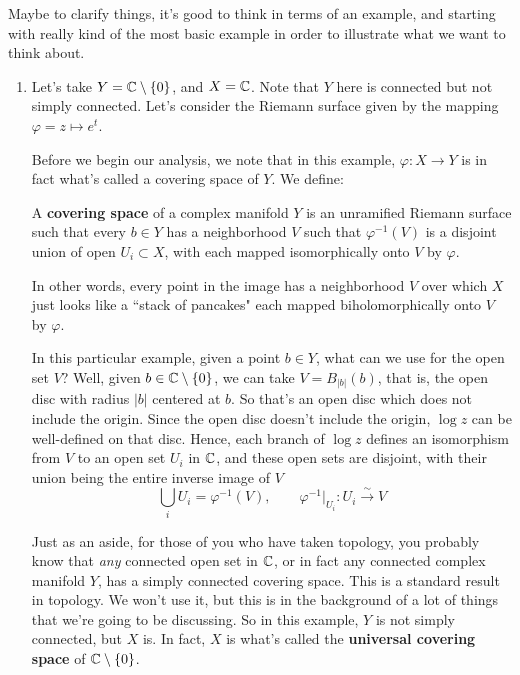 \documentclass{article}
\begin{document}
Maybe to clarify things, it's good to think in terms of an example, and starting with really kind of the most basic example in order to illustrate what we want to think about.

\begin{enumerate}


  \item \label{example:et_riemann_surface}
  Let's take \(Y = \mathbb{C} \setminus \{0\}\), and \(X = \mathbb{C}\). Note that \(Y\) here is connected but not simply connected. Let's consider the Riemann surface given by the mapping \(\varphi = z \mapsto e^t\).

  Before we begin our analysis, we note that in this example, \(\varphi: X \to Y\) is in fact what's called a covering space of \(Y\). We define:
  \begin{definition}
  A \textbf{covering space} of a complex manifold \(Y\) is an unramified Riemann surface such that every \(b \in Y\) has a neighborhood \(V\) such that \(\varphi^{-1}(V)\) is a disjoint union of open \(U_i \subset X\), with each mapped isomorphically onto \(V\) by \(\varphi\).
  \end{definition}
  In other words, every point in the image has a neighborhood \(V\) over which \(X\) just looks like a ``stack of pancakes" each mapped biholomorphically onto \(V\) by \(\varphi\).

  In this particular example, given a point \(b \in Y\), what can we use for the open set \(V\)? Well, given \(b \in \mathbb{C} \setminus \{0\}\), we can take \(V = B_{|b|}(b)\), that is, the open disc with radius \(|b|\) centered at \(b\). So that's an open disc which does not include the origin. Since the open disc doesn't include the origin, \(\log z\) can be well-defined on that disc. Hence, each branch of \(\log z\) defines an isomorphism from \(V\) to an open set \(U_i\) in \(\mathbb{C}\), and these open sets are disjoint, with their union being the entire inverse image of \(V\)
  \begin{equation}
    \bigcup_iU_i = \varphi^{-1}(V), \qquad \varphi^{-1}|_{U_i}: U_i \xrightarrow{\sim} V
  \end{equation}

  Just as an aside, for those of you who have taken topology, you probably know that \textit{any} connected open set in \(\mathbb{C}\), or in fact any connected complex manifold \(Y\), has a simply connected covering space. This is a standard result in topology. We won't use it, but this is in the background of a lot of things that we're going to be discussing. So in this example, \(Y\) is not simply connected, but \(X\) is. In fact, \(X\) is what's called the \textbf{universal covering space} of \(\mathbb{C} \setminus \{0\}\).


\end{enumerate}
\end{document}
